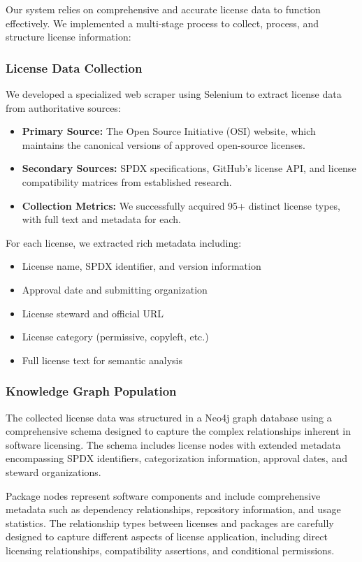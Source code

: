 \documentclass[9pt,twocolumn]{article}
\begin{document}
Our system relies on comprehensive and accurate license data to function effectively. We implemented a multi-stage process to collect, process, and structure license information:

\subsubsection{License Data Collection}
We developed a specialized web scraper using Selenium to extract license data from authoritative sources:

\begin{itemize}
    \item \textbf{Primary Source:} The Open Source Initiative (OSI) website, which maintains the canonical versions of approved open-source licenses.
    \item \textbf{Secondary Sources:} SPDX specifications, GitHub's license API, and license compatibility matrices from established research.
    \item \textbf{Collection Metrics:} We successfully acquired 95+ distinct license types, with full text and metadata for each.
\end{itemize}

For each license, we extracted rich metadata including:
\begin{itemize}
    \item License name, SPDX identifier, and version information
    \item Approval date and submitting organization
    \item License steward and official URL
    \item License category (permissive, copyleft, etc.)
    \item Full license text for semantic analysis
\end{itemize}

\subsubsection{Knowledge Graph Population}
The collected license data was structured in a Neo4j graph database using a comprehensive schema designed to capture the complex relationships inherent in software licensing. The schema includes license nodes with extended metadata encompassing SPDX identifiers, categorization information, approval dates, and steward organizations.

Package nodes represent software components and include comprehensive metadata such as dependency relationships, repository information, and usage statistics. The relationship types between licenses and packages are carefully designed to capture different aspects of license application, including direct licensing relationships, compatibility assertions, and conditional permissions.
\end{document}

